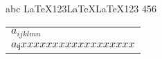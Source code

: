 \documentclass{minimal}
\makeatletter
\def\ignoreOneCopyFour#1#2#3#4#5{%
#2#3#4#5#1#2#3#4#5%
}
\def\@caputureFirstToken{%
  \afterassignment\@captureSecondToken%
  \def\@firsttoken=%
}
\def\@captureSecondToken{%
  \afterassignment\@captureThirdToken%
  \let\@secondtoken=%
}
\def\@captureThirdToken{%
  \afterassignment\@captureFourthToken%
  \let\@thirdtoken=%
}
\def\@captureFourthToken{%
  \afterassignment\@constructSequence%
  \let\@fourthtoken=%
}
\def\@constructSequence{%
\typeout{CS 1: \meaning\@firstcs}%
\typeout{INPUT 1: \meaning\@firsttoken}%
\typeout{INPUT 2: \meaning\@secondtoken}%
\typeout{INPUT 3: \meaning\@thirdtoken}%
\typeout{INPUT 4: \meaning\@fourthtoken}%
%
%
\noexpand\@firsttoken\noexpand\@secondtoken\noexpand\@thirdtoken\noexpand\@fourthtoken%
\@firstcs%
\noexpand\@firsttoken\noexpand\@secondtoken\noexpand\@thirdtoken\noexpand\@fourthtoken%
%
}
\makeatother
\begin{document}
\def\z{M}
\def\Z{C}
\def\a{\z er}
\def\b{ry }
\def\c{\Z hr}
\def\d{ist}
\def\e{mas}
%




abc\ignoreOneCopyFour\LaTeX\LaTeX123456

\begin{tabular}{l}
   $a_{ijklmn}$ \\
   $aᵢⱼxxxxxxxxxxxxxxxxxx$
\end{tabular}
%
%
%
%

\end{document}
